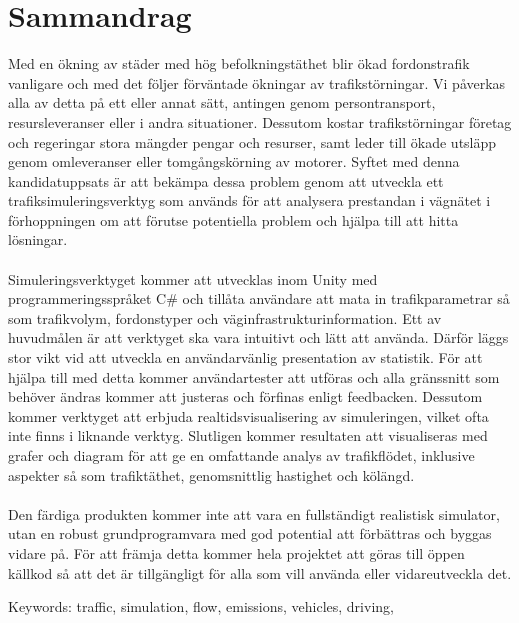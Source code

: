 \section*{Sammandrag}
    Med en ökning av städer med hög befolkningstäthet blir ökad fordonstrafik vanligare och med det följer förväntade ökningar av trafikstörningar. Vi påverkas alla av detta på ett eller annat sätt, antingen genom persontransport, resursleveranser eller i andra situationer. Dessutom kostar trafikstörningar företag och regeringar stora mängder pengar och resurser, samt leder till ökade utsläpp genom omleveranser eller tomgångskörning av motorer. Syftet med denna kandidatuppsats är att bekämpa dessa problem genom att utveckla ett trafiksimuleringsverktyg som används för att analysera prestandan i vägnätet i förhoppningen om att förutse potentiella problem och hjälpa till att hitta lösningar.
    \\\\
    Simuleringsverktyget kommer att utvecklas inom Unity med programmeringsspråket C\# och tillåta användare att mata in trafikparametrar så som trafikvolym, fordonstyper och väginfrastrukturinformation. Ett av huvudmålen är att verktyget ska vara intuitivt och lätt att använda. Därför läggs stor vikt vid att utveckla en användarvänlig presentation av statistik. För att hjälpa till med detta kommer användartester att utföras och alla gränssnitt som behöver ändras kommer att justeras och förfinas enligt feedbacken. Dessutom kommer verktyget att erbjuda realtidsvisualisering av simuleringen, vilket ofta inte finns i liknande verktyg. Slutligen kommer resultaten att visualiseras med grafer och diagram för att ge en omfattande analys av trafikflödet, inklusive aspekter så som trafiktäthet, genomsnittlig hastighet och kölängd. 
    \\\\
    Den färdiga produkten kommer inte att vara en fullständigt realistisk simulator, utan en robust grundprogramvara med god potential att förbättras och byggas vidare på. För att främja detta kommer hela projektet att göras till öppen källkod så att det är tillgängligt för alla som vill använda eller vidareutveckla det.

\vfill
Keywords: traffic, simulation, flow, emissions, vehicles, driving,

\newpage
\thispagestyle{empty}
\mbox{}